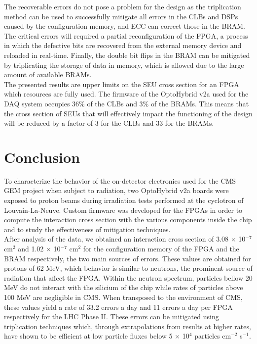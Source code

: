       The recoverable errors do not pose a problem for the design as the triplication method can be used to successfully mitigate all errors in the CLBs and DSPs caused by the configuration memory, and ECC can correct those in the BRAM. The critical errors will required a partial reconfiguration of the FPGA, a process in which the defective bits are recovered from the external memory device and reloaded in real-time. Finally, the double bit flips in the BRAM can be mitigated by triplicating the storage of data in memory, which is allowed due to the large amount of available BRAMs. \\

      The presented results are upper limits on the SEU cross section for an FPGA which resources are fully used. The firmware of the OptoHybrid v2a used for the DAQ system occupies 36\% of the CLBs and 3\% of the BRAMs. This means that the cross section of SEUs that will effectively impact the functioning of the design will be reduced by a factor of 3 for the CLBs and 33 for the BRAMs.

  \section{Conclusion}

    To characterize the behavior of the on-detector electronics used for the CMS GEM project when subject to radiation, two OptoHybrid v2a boards were exposed to proton beams during irradiation tests performed at the cyclotron of Louvain-La-Neuve. Custom firmware was developed for the FPGAs in order to compute the interaction cross section with the various components inside the chip and to study the effectiveness of mitigation techniques.  \\

    After analysis of the data, we obtained an interaction cross section of 3.08 $ \times $ 10$^{-7}$ cm$^{2}$ and 1.02 $ \times $ 10$^{-7}$ cm$^{2}$ for the configuration memory of the FPGA and the BRAM respectively, the two main sources of errors. These values are obtained for protons of 62 MeV, which behavior is similar to neutrons, the prominent source of radiation that affect the FPGA. Within the neutron spectrum, particles bellow 20 MeV do not interact with the silicium of the chip while rates of particles above 100 MeV are negligible in CMS. When transposed to the environment of CMS, these values yield a rate of 33.2 errors a day and 11 errors a day per FPGA respectively for the LHC Phase II. These errors can be mitigated using triplication techniques which, through extrapolations from results at higher rates, have shown to be efficient at low particle fluxes below 5 $ \times $ 10$^4$ particles cm$^{-2}$ s$^{-1}$. \\

